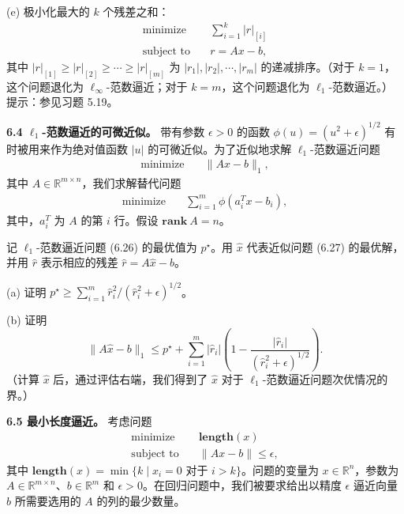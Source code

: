 \documentclass[UTF8,12pt,a4paper,fontset=fandol]{ctexart}
\begin{document}
(e) 极小化最大的 $k$ 个残差之和：
\[
\begin{aligned}
\text{minimize}\quad & \sum_{i=1}^k |r|_{[i]}\\
\text{subject to}\quad & r=Ax-b,
\end{aligned}
\]
其中 $|r|_{[1]}\geq |r|_{[2]}\geq \cdots\geq |r|_{[m]}$ 为 $|r_1|,|r_2|,\cdots,|r_m|$ 的递减排序。（对于 $k=1$，这个问题退化为 $\ell_\infty$-范数逼近；对于 $k=m$，这个问题退化为 $\ell_1$-范数逼近。）提示：参见习题 5.19。

\noindent\textbf{6.4 $\ell_1$-范数逼近的可微近似。}\quad
带有参数 $\epsilon>0$ 的函数 $\phi(u)=(u^2+\epsilon)^{1/2}$ 有时被用来作为绝对值函数 $|u|$ 的可微近似。为了近似地求解 $\ell_1$-范数逼近问题
\begin{equation}
\begin{aligned}
\text{minimize}\quad & \|Ax-b\|_1,
\end{aligned}
\tag{6.26}
\end{equation}
其中 $A\in\mathbb{R}^{m\times n}$，我们求解替代问题
\begin{equation}
\begin{aligned}
\text{minimize}\quad & \sum_{i=1}^m \phi(a_i^Tx-b_i),
\end{aligned}
\tag{6.27}
\end{equation}
其中，$a_i^T$ 为 $A$ 的第 $i$ 行。假设 $\mathbf{rank}\ A=n$。

记 $\ell_1$-范数逼近问题 (6.26) 的最优值为 $p^\star$。用 $\hat{x}$ 代表近似问题 (6.27) 的最优解，并用 $\hat{r}$ 表示相应的残差 $\hat{r}=A\hat{x}-b$。

(a) 证明 $p^\star\geq \sum_{i=1}^m \hat{r}_i^2/(\hat{r}_i^2+\epsilon)^{1/2}$。

(b) 证明
\[
\|A\hat{x}-b\|_1\leq p^\star+\sum_{i=1}^m |\hat{r}_i|\left(1-\frac{|\hat{r}_i|}{(\hat{r}_i^2+\epsilon)^{1/2}}\right).
\]
（计算 $\hat{x}$ 后，通过评估右端，我们得到了 $\hat{x}$ 对于 $\ell_1$-范数逼近问题次优情况的界。）

\noindent\textbf{6.5 最小长度逼近。}\quad
考虑问题
\[
\begin{aligned}
\text{minimize}\quad & \mathbf{length}(x)\\
\text{subject to}\quad & \|Ax-b\|\leq \epsilon,
\end{aligned}
\]
其中 $\mathbf{length}(x)=\min\{k\mid x_i=0\text{ 对于 }i>k\}$。问题的变量为 $x\in\mathbb{R}^n$，参数为 $A\in\mathbb{R}^{m\times n}$、$b\in\mathbb{R}^m$ 和 $\epsilon>0$。在回归问题中，我们被要求给出以精度 $\epsilon$ 逼近向量 $b$ 所需要选用的 $A$ 的列的最少数量。
\end{document}
